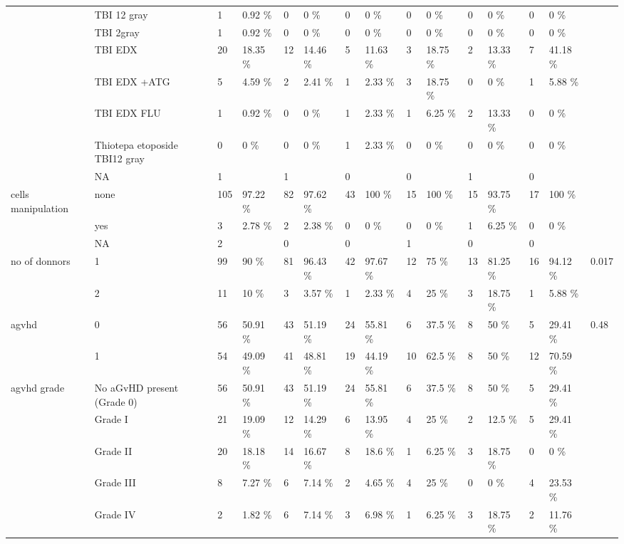 \documentclass[a4paper,11pt] {article}
\begin{document}
\begin{landscape}
\begin{longtable}{lllllllllllllll}
   & TBI 12 gray & 1 & 0.92 \% & 0 & 0 \% & 0 & 0 \% & 0 & 0 \% & 0 & 0 \% & 0 & 0 \% &  \\ 
   & TBI 2gray & 1 & 0.92 \% & 0 & 0 \% & 0 & 0 \% & 0 & 0 \% & 0 & 0 \% & 0 & 0 \% &  \\ 
   & TBI EDX & 20 & 18.35 \% & 12 & 14.46 \% & 5 & 11.63 \% & 3 & 18.75 \% & 2 & 13.33 \% & 7 & 41.18 \% &  \\ 
   & TBI EDX +ATG & 5 & 4.59 \% & 2 & 2.41 \% & 1 & 2.33 \% & 3 & 18.75 \% & 0 & 0 \% & 1 & 5.88 \% &  \\ 
   & TBI EDX FLU & 1 & 0.92 \% & 0 & 0 \% & 1 & 2.33 \% & 1 & 6.25 \% & 2 & 13.33 \% & 0 & 0 \% &  \\ 
   & Thiotepa etoposide TBI12 gray & 0 & 0 \% & 0 & 0 \% & 1 & 2.33 \% & 0 & 0 \% & 0 & 0 \% & 0 & 0 \% &  \\ 
   & NA & 1 &  & 1 &  & 0 &  & 0 &  & 1 &  & 0 &  &  \\ 
  cells manipulation & none & 105 & 97.22 \% & 82 & 97.62 \% & 43 & 100 \% & 15 & 100 \% & 15 & 93.75 \% & 17 & 100 \% &  \\ 
   & yes & 3 & 2.78 \% & 2 & 2.38 \% & 0 & 0 \% & 0 & 0 \% & 1 & 6.25 \% & 0 & 0 \% &  \\ 
   & NA & 2 &  & 0 &  & 0 &  & 1 &  & 0 &  & 0 &  &  \\ 
  no of donnors & 1 & 99 & 90 \% & 81 & 96.43 \% & 42 & 97.67 \% & 12 & 75 \% & 13 & 81.25 \% & 16 & 94.12 \% & 0.017 \\ 
   & 2 & 11 & 10 \% & 3 & 3.57 \% & 1 & 2.33 \% & 4 & 25 \% & 3 & 18.75 \% & 1 & 5.88 \% &  \\ 
  agvhd & 0 & 56 & 50.91 \% & 43 & 51.19 \% & 24 & 55.81 \% & 6 & 37.5 \% & 8 & 50 \% & 5 & 29.41 \% & 0.48 \\ 
   & 1 & 54 & 49.09 \% & 41 & 48.81 \% & 19 & 44.19 \% & 10 & 62.5 \% & 8 & 50 \% & 12 & 70.59 \% &  \\ 
  agvhd grade & No aGvHD present (Grade 0) & 56 & 50.91 \% & 43 & 51.19 \% & 24 & 55.81 \% & 6 & 37.5 \% & 8 & 50 \% & 5 & 29.41 \% &  \\ 
   & Grade I & 21 & 19.09 \% & 12 & 14.29 \% & 6 & 13.95 \% & 4 & 25 \% & 2 & 12.5 \% & 5 & 29.41 \% &  \\ 
   & Grade II & 20 & 18.18 \% & 14 & 16.67 \% & 8 & 18.6 \% & 1 & 6.25 \% & 3 & 18.75 \% & 0 & 0 \% &  \\ 
   & Grade III & 8 & 7.27 \% & 6 & 7.14 \% & 2 & 4.65 \% & 4 & 25 \% & 0 & 0 \% & 4 & 23.53 \% &  \\ 
   & Grade IV & 2 & 1.82 \% & 6 & 7.14 \% & 3 & 6.98 \% & 1 & 6.25 \% & 3 & 18.75 \% & 2 & 11.76 \% &  \\ 

\end{longtable}
\end{landscape}
\end{document}
